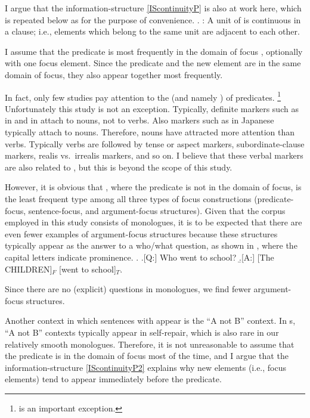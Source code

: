 I argue that the information-structure  \ref{IScontinuityP} is also at work here, which is repeated below as \Next for the purpose of convenience.
%
\ex. \label{IScontinuityP2}:
 A unit of  is continuous in a clause;
 i.e., elements which belong to the same unit are adjacent to each other.

I assume that
the predicate is most frequently in the domain of focus \cite{lambrecht94},
optionally with one focus element.
Since the predicate and the new element are in the same domain of focus,
they also appear together most frequently.

In fact, only few studies pay attention to the  (and namely ) of predicates.%
	\footnote{
	 is an important exception.
	}
Unfortunately this study is not an exception.
Typically, definite markers such as  in  and  in  attach to nouns, not to verbs.
Also  markers such as  in Japanese typically attach to nouns.
Therefore, nouns have attracted more attention than verbs.
Typically verbs are followed by tense or aspect markers, subordinate-clause markers, realis vs.\ irrealis markers, and so on.
I believe that these verbal markers are also related to ,
but this is beyond the scope of this study.

However,
it is obvious that ,
where the predicate is not in the domain of focus,
is the least frequent type among all three types of focus constructions (predicate-focus, sentence-focus, and argument-focus structures).
Given that the corpus employed in this study consists of monologues, it is to be expected that there are even fewer examples of argument-focus structures because these structures typically appear as the answer to a who/what question, as shown in \Next, where the capital letters indicate prominence.
%
\ex.
 \a.[Q:] Who went to school?
 \b.[A:] [The CHILDREN]$_{F}$ [went to school]$_{T}$.
 \hfill{\cite[][121]{lambrecht94}}

Since there are no (explicit) questions in monologues,
we find fewer argument-focus structures.

Another context in which sentences with  appear is the ``A not B'' context.
In s, ``A not B'' contexts typically appear in self-repair,
which is also rare in our relatively smooth monologues.
Therefore, it is not unreasonable to assume that the predicate is in the domain of focus most of the time,
and I argue that the information-structure  \ref{IScontinuityP2} explains why new elements (i.e., focus elements) tend to appear immediately before the predicate.

